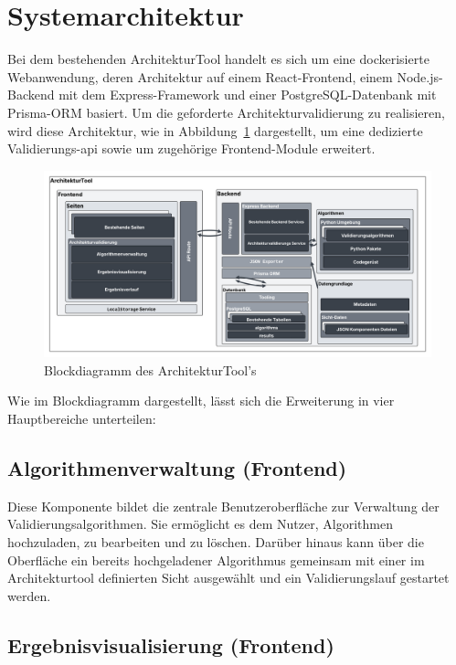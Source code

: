 \section{Systemarchitektur}

Bei dem bestehenden ArchitekturTool handelt es sich um eine dockerisierte Webanwendung, deren Architektur auf einem React-Frontend, einem Node.js-Backend mit dem Express-Framework und einer PostgreSQL-Datenbank mit Prisma-ORM basiert. Um die geforderte Architekturvalidierung zu realisieren, wird diese Architektur, wie in Abbildung~\ref{fig:blockdiagram} dargestellt, um eine dedizierte Validierungs-\gls{api} sowie um zugehörige Frontend-Module erweitert.


\begin{figure}[h!]
  \centering
  \includegraphics[width=\textwidth]{figures/04Konzeption/Blockdiagram.png}
  \caption{Blockdiagramm des ArchitekturTool's}
  \label{fig:blockdiagram}
\end{figure}


Wie im Blockdiagramm dargestellt, lässt sich die Erweiterung in vier Hauptbereiche unterteilen:

\subsection*{Algorithmenverwaltung (Frontend)}

Diese Komponente bildet die zentrale Benutzeroberfläche zur Verwaltung der Validierungsalgorithmen. Sie ermöglicht es dem Nutzer, Algorithmen hochzuladen, zu bearbeiten und zu löschen. Darüber hinaus kann über die Oberfläche ein bereits hochgeladener Algorithmus gemeinsam mit einer im Architekturtool definierten Sicht ausgewählt und ein Validierungslauf gestartet werden.

\subsection*{Ergebnisvisualisierung (Frontend)}

